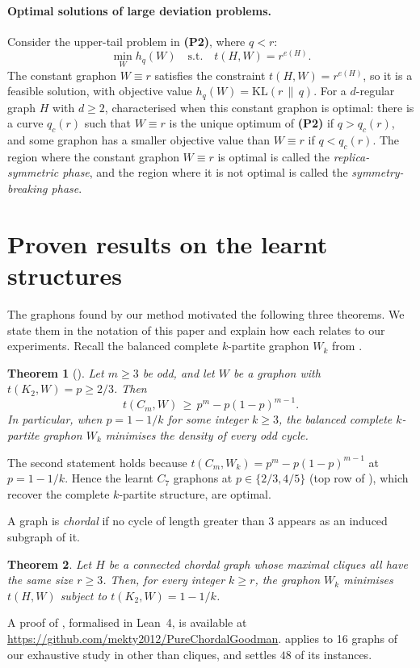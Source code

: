 \documentclass{article}
\theoremstyle{plain}
\newtheorem{theorem}{Theorem}[section]
\theoremstyle{definition}
\theoremstyle{remark}
\begin{document}
\paragraph{Optimal solutions of large deviation problems.}
Consider the upper-tail problem in \textbf{(P2)}, where $q < r$:
\[
\min_{W} h_q(W) \quad \text{s.t.} \quad t(H, W) = r^{e(H)}.
\]
The constant graphon $W \equiv r$ satisfies the constraint $t(H, W) = r^{e(H)}$, so it is a feasible solution, with objective value $h_q(W) = \mathrm{KL}(r \,\|\, q)$. For a $d$-regular graph $H$ with $d \ge 2$, \citet{lubetzky2015replica} characterised when this constant graphon is optimal: there is a curve $q_c(r)$ such that $W \equiv r$ is the unique optimum of \textbf{(P2)} if $q > q_c(r)$, and some graphon has a smaller objective value than $W \equiv r$ if $q < q_c(r)$. The region where the constant graphon $W \equiv r$ is optimal is called the \emph{replica-symmetric phase}, and the region where it is not optimal is called the \emph{symmetry-breaking phase}.

\section{Proven results on the learnt structures}\label{sec:proven}

The graphons found by our method motivated the following three theorems. We state them in the notation of this paper and explain how each relates to our experiments. Recall the balanced complete $k$-partite graphon $W_k$ from .

\begin{theorem}[\citealp{im2026goodman}]\label{thm:oddcycle}
Let $m \ge 3$ be odd, and let $W$ be a graphon with $t(K_2, W) = p \ge 2/3$. Then
\[
t(C_m, W) \,\ge\, p^m - p(1-p)^{m-1}.
\]
In particular, when $p = 1 - 1/k$ for some integer $k \ge 3$, the balanced complete $k$-partite graphon $W_k$ minimises the density of every odd cycle.
\end{theorem}
The second statement holds because $t(C_m, W_k) = p^m - p(1-p)^{m-1}$ at $p = 1 - 1/k$. Hence the learnt $C_7$ graphons at $p \in \{2/3, 4/5\}$ (top row of ), which recover the complete $k$-partite structure, are optimal.

A graph is \emph{chordal} if no cycle of length greater than $3$ appears as an induced subgraph of it.
\begin{theorem}\label{thm:chordal}
Let $H$ be a connected chordal graph whose maximal cliques all have the same size $r \ge 3$. Then, for every integer $k \ge r$, the graphon $W_k$ minimises $t(H, W)$ subject to $t(K_2, W) = 1 - 1/k$.
\end{theorem}
A proof of , formalised in Lean~4, is available at \url{https://github.com/mekty2012/PureChordalGoodman}.  applies to 16 graphs of our exhaustive study in  other than cliques, and settles $48$ of its instances.
\end{document}
